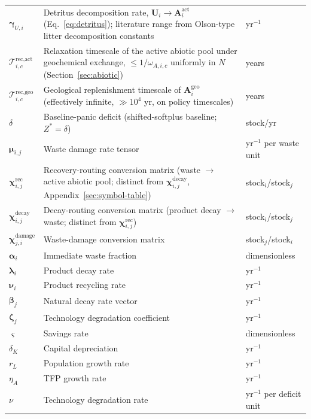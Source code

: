 \documentclass[twocolumn,10pt]{article}
\begin{document}
\begin{table}[t]
\begin{tabularx}{\textwidth}{l X l}
\(\boldsymbol\gamma_{U,i}\) & Detritus decomposition rate, \(\mathbf U_i\to\mathbf A^{\text{act}}_i\) (Eq.~\eqref{eq:detritus}); literature range from Olson-type litter decomposition constants \cite{olson1963} & yr\(^{-1}\) \\
\(\mathcal{T}^{\text{rec},\text{act}}_{i,c}\) & Relaxation timescale of the active abiotic pool under geochemical exchange, \(\le1/\omega_{A,i,c}\) uniformly in \(N\) (Section~\ref{sec:abiotic}) & years \\
\(\mathcal{T}^{\text{rec},\text{geo}}_{i,c}\) & Geological replenishment timescale of \(\mathbf A^{\text{geo}}_i\) (effectively infinite, \(\gg10^4\) yr, on policy timescales) & years \\
\(\delta\) & Baseline-panic deficit (shifted-softplus baseline; \(Z^*=\delta\)) & stock/yr \\
\(\boldsymbol{\mu}_{i,j}\) & Waste damage rate tensor & yr\(^{-1}\) per waste unit \\
\(\boldsymbol{\chi}^{\text{rec}}_{i,j}\) & Recovery-routing conversion matrix (waste $\to$ active abiotic pool; distinct from $\boldsymbol\chi^{\text{decay}}_{i,j}$, Appendix~\ref{sec:symbol-table}) & stock\(_i\)/stock\(_j\) \\
\(\boldsymbol{\chi}^{\text{decay}}_{i,j}\) & Decay-routing conversion matrix (product decay $\to$ waste; distinct from $\boldsymbol\chi^{\text{rec}}_{i,j}$) & stock\(_i\)/stock\(_j\) \\
\(\boldsymbol{\chi}^{\text{damage}}_{j,i}\) & Waste-damage conversion matrix & stock\(_j\)/stock\(_i\) \\
\(\boldsymbol{\alpha}_i\) & Immediate waste fraction & dimensionless \\
\(\boldsymbol{\lambda}_i\) & Product decay rate & yr\(^{-1}\) \\
\(\boldsymbol{\nu}_i\) & Product recycling rate & yr\(^{-1}\) \\
\(\boldsymbol{\beta}_j\) & Natural decay rate vector & yr\(^{-1}\) \\
\(\boldsymbol{\zeta}_j\) & Technology degradation coefficient & yr\(^{-1}\) \\
\(\varsigma\) & Savings rate & dimensionless \\
\(\delta_K\) & Capital depreciation & yr\(^{-1}\) \\
\(r_L\) & Population growth rate & yr\(^{-1}\) \\
\(\eta_A\) & TFP growth rate & yr\(^{-1}\) \\
\(\nu\) & Technology degradation rate & yr\(^{-1}\) per deficit unit \\

\end{tabularx}
\end{table}
\end{document}
